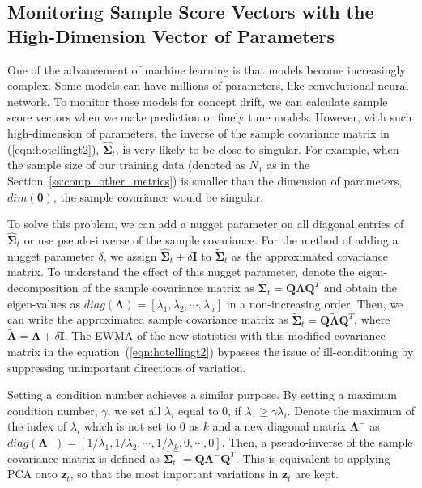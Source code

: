 \documentclass[twoside,11pt]{article}
\begin{document}
\subsection{Monitoring Sample Score Vectors with the High-Dimension Vector of Parameters}
One of the advancement of machine learning is that models become increasingly complex. Some models can have millions of parameters, like convolutional neural network. To monitor those models for concept drift, we can calculate sample score vectors when we make prediction or finely tune models. However, with such high-dimension of parameters, the inverse of the sample covariance matrix in (\ref{eqn:hotellingt2}), $\hat {\bm { \Sigma}}_t$, is very likely to be close to singular. For example, when the sample size of our training data (denoted as $N_1$ as in the Section~\ref{ss:comp_other_metrics}) is smaller than the dimension of parameters, $dim(\bm { \theta})$, the sample covariance would be singular. 

To solve this problem, we can add a nugget parameter on all diagonal entries of $\hat {\bm { \Sigma}}_t$ or use pseudo-inverse of the sample covariance. For the method of adding a nugget parameter $ \delta$, we assign $\hat {\bm { \Sigma}}_t+ \delta \bm {I}$ to $\tilde {\bm { \Sigma}}_t$ as the approximated covariance matrix. To understand the effect of this nugget parameter, denote the eigen-decomposition of the sample covariance matrix as $\hat {\bm { \Sigma}}_t = \bm {Q}\bm { \Lambda} \bm {Q}^T$ and obtain the eigen-values as $ diag(\bm{\Lambda}) = [ \lambda_1, \lambda_2,\cdots, \lambda_n]$ in a non-increasing order. Then, we can write the approximated sample covariance matrix as $\tilde {\bm { \Sigma}}_t = \bm {Q}\tilde{\bm { \Lambda}} \bm {Q}^T$, where $\tilde{\bm { \Lambda}} = \bm { \Lambda} + \delta \bm {I}$. The EWMA of the new statistics with this modified covariance matrix in the equation~(\ref{eqn:hotellingt2}) bypasses the issue of ill-conditioning by suppressing unimportant directions of variation. 

Setting a condition number achieves a similar purpose. By setting a maximum condition number, $ \gamma$, we set all $ \lambda_i$ equal to $0$, if $ \lambda_1 \geq \gamma \lambda_i$. Denote the maximum of the index of $ \lambda_i$ which is not set to $0$ as $k$ and a new diagonal matrix $\bm { \Lambda} ^{-}$ as $diag(\bm { \Lambda} ^{-}) = [1/\lambda_1,1/\lambda_2, \cdots, 1/\lambda_k, 0, \cdots, 0]$. Then, a pseudo-inverse of the sample covariance matrix is defined as $\hat {\bm { \Sigma}}_t ^{-} = \bm {Q}\bm { \Lambda}^{-}\bm {Q}^T$. This is equivalent to applying PCA onto $\bm {z}_t$, so that the most important variations in $\bm {z}_t$ are kept. 
\end{document}
